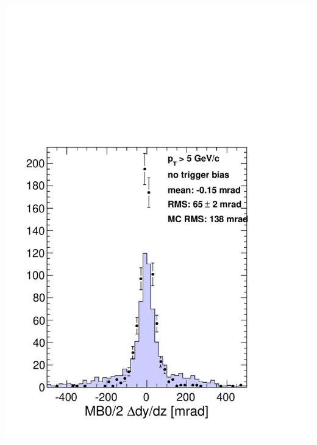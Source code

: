 \documentclass[compress]{beamer}
\begin{document}
\begin{frame}
\begin{columns}
\includegraphics[width=\linewidth]{mb02_dYdZ.pdf}


\end{columns}
\end{frame}
\end{document}
